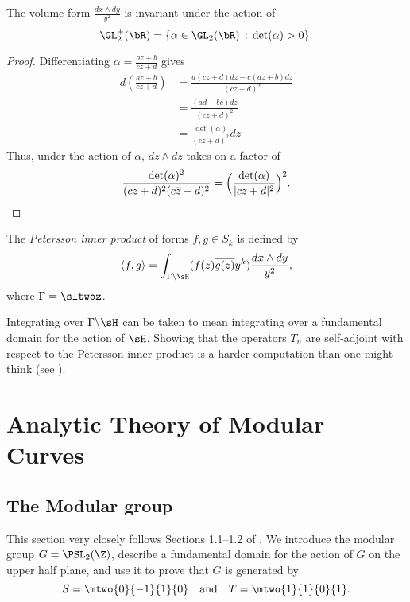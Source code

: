 \documentclass{report}
\begin{document}
\begin{proposition}
The volume form
$\frac{dx\wedge dy}{y^2}$ is invariant under the action of
$$\GL_2^{+}(\bR)=\{\alpha \in\GL_2(\bR) \,:\, \det(\alpha)>0\}.$$
\end{proposition}
\begin{proof}
Differentiating $\alpha=\frac{az+b}{cz+d}$ gives
\begin{align*}
d\left(\frac{az+b}{cz+d}\right)&=
\frac{a(cz+d)dz-c(az+b)dz}{(cz+d)^2}\\
&=\frac{(ad-bc)dz}{(cz+d)^2}\\
&= \frac{\det(\alpha)}{(cz+d)^2}dz
\end{align*}
Thus, under the action of $\alpha$, $dz\wedge d{\overline z}$
takes on a factor of
$$\frac{\det(\alpha)^2}{(cz+d)^2(c\overline{z}+d)^2}
=\Bigl(\frac{\det(\alpha)}{|cz+d|^2}\Bigr)^2.$$
\end{proof}

\begin{defn}
The {\em Petersson inner product} of forms $f,g\in S_k$ is defined by
$$\langle f,g\rangle =\int_{\Gamma\backslash\sH}(f(z)\overline{g(z)}y^k)
\frac{dx\wedge dy}{y^2},$$
where $\Gamma=\sltwoz$.
\end{defn}

Integrating over $\Gamma\backslash\sH$ can be taken to mean integrating
over a fundamental domain for the action of $\sH$. Showing that the
operators $T_n$ are self-adjoint with respect to the Petersson inner
product is a harder computation than one might think (see
\cite[\S{}III.4]{lang:modular}).


\chapter{Analytic Theory of Modular Curves}\label{sec:anmodcurve}

\section{The Modular group}

This section very closely follows Sections 1.1--1.2 of
\cite{serre:arithmetic}.  We introduce the modular group
$G=\PSL_2(\Z)$, describe a fundamental domain for the action of
$G$ on the upper half plane, and use it to prove that $G$ is
generated by
$$
   S=\mtwo{0}{-1}{1}{0}\quad\text{and}\quad T=\mtwo{1}{1}{0}{1}.
$$
\end{document}
